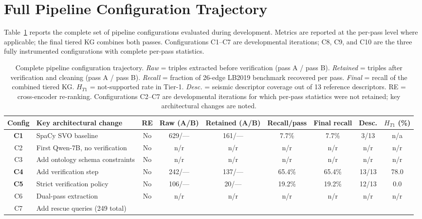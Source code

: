 \documentclass[10pt]{article}
\begin{document}
\section{Full Pipeline Configuration Trajectory}
\label{app:full-trajectory}

Table~\ref{tab:full-trajectory} reports the complete
set of pipeline configurations evaluated during
development.
Metrics are reported at the per-pass level where
applicable; the final tiered KG combines both passes.
Configurations C1--C7 are developmental iterations;
C8, C9, and C10 are the three fully instrumented
configurations with complete per-pass statistics.

\begin{table}[htb]
\centering
\caption{Complete pipeline configuration trajectory.
  \emph{Raw} = triples extracted before verification
  (pass A / pass B).
  \emph{Retained} = triples after verification and
  cleaning (pass A / pass B).
  \emph{Recall} = fraction of 26-edge LB2019
  benchmark recovered per pass.
  \emph{Final} = recall of the combined tiered KG.
  $H_{T1}$ = not-supported rate in Tier-1.
  \emph{Desc.} = seismic descriptor coverage
  out of 13 reference descriptors.
  RE = cross-encoder re-ranking.
  Configurations C2--C7 are developmental iterations
  for which per-pass statistics were not retained;
  key architectural changes are noted.}
\label{tab:full-trajectory}
\footnotesize
\setlength{\tabcolsep}{4pt}
\begin{tabular}{clccccccc}
\toprule
\textbf{Config} &
\textbf{Key architectural change} &
\textbf{RE} &
\textbf{Raw (A/B)} &
\textbf{Retained (A/B)} &
\textbf{Recall/pass} &
\textbf{Final recall} &
\textbf{Desc.} &
$H_{T1}$ (\%) \\
\midrule
\textbf{C1}
  & SpaCy SVO baseline
  & No & 629/--- & 161/--- & 7.7\% & 7.7\% & 3/13 & n/a \\
C2
  & First Qwen-7B, no verification
  & No & n/r & n/r & n/r & n/r & n/r & n/r \\
C3
  & Add ontology schema constraints
  & No & n/r & n/r & n/r & n/r & n/r & n/r \\
\textbf{C4}
  & Add verification step
  & No & 242/--- & 137/--- & 65.4\% & 65.4\% & 13/13 & 78.0 \\
\textbf{C5}
  & Strict verification policy
  & No & 106/--- & 20/--- & 19.2\% & 19.2\% & 12/13 & 0.0 \\
C6
  & Dual-pass extraction
  & No & n/r & n/r & n/r & n/r & n/r & n/r \\
C7
  & Add rescue queries (249 total)

\end{tabular}
\end{table}
\end{document}
